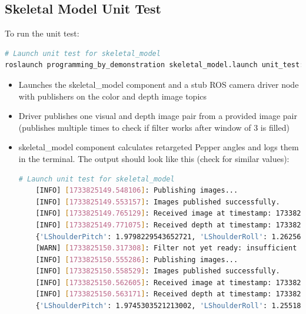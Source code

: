 \documentclass{CSSRforAfrica}
\begin{document}
\subsection*{Skeletal Model Unit Test}
To run the unit test:
\begin{lstlisting}[style=withoutNumbering, language=bash]
# Launch unit test for skeletal_model
roslaunch programming_by_demonstration skeletal_model.launch unit_test:=true
\end{lstlisting}

\begin{itemize}
    \item Launches the skeletal\_model component and a stub ROS camera driver node with publishers on the color and depth image topics
    \item Driver publishes one visual and depth image pair from a provided image pair (publishes multiple times to check if filter works after window of 3 is filled)
    \item skeletal\_model component calculates retargeted Pepper angles and logs them in the terminal. The output should look like this (check for similar values): 
    \begin{lstlisting}[style=withoutNumbering, language=bash]
    # Launch unit test for skeletal_model
    [INFO] [1733825149.548106]: Publishing images...
    [INFO] [1733825149.553157]: Images published successfully.
    [INFO] [1733825149.765129]: Received image at timestamp: 1733825149547950267
    [INFO] [1733825149.771075]: Received depth at timestamp: 1733825149547950267
    {'LShoulderPitch': 1.9798229543652721, 'LShoulderRoll': 1.2625669566199917, 'LElbowRoll': -0.2965326466083589, 'LElbowYaw': -2.7877042812891686, 'LWristYaw': 0, 'RShoulderPitch': 1.9550295042596533, 'RShoulderRoll': -1.0647517275688356, 'RElbowRoll': 0.3358612598878903, 'RElbowYaw': -2.537359649353141, 'RWristYaw': 0}
    [WARN] [1733825150.317308]: Filter not yet ready: insufficient data in window
    [INFO] [1733825150.555286]: Publishing images...
    [INFO] [1733825150.558529]: Images published successfully.
    [INFO] [1733825150.562605]: Received image at timestamp: 1733825150555179834
    [INFO] [1733825150.563171]: Received depth at timestamp: 1733825150555179834
    {'LShoulderPitch': 1.9745303521213002, 'LShoulderRoll': 1.2551816026093596, 'LElbowRoll': -0.30925236016320845, 'LElbowYaw': -2.809200505750682, 'LWristYaw': 0, 'RShoulderPitch': 1.9574034886210552, 'RShoulderRoll': -1.0656933454976425, 'RElbowRoll': 0.3358612598878903, 'RElbowYaw': -2.537359649353141, 'RWristYaw': 0}

\end{lstlisting}
\end{itemize}
\end{document}
